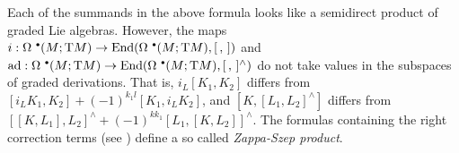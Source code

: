 \begin{rem}
    Each of the summands in the above formula looks like a semidirect product of graded Lie algebras. However, the maps $i:\Omega^{\smbullet}(M;\T M)\to \End(\Omega^{\smbullet}(M;\T M),[\,,\,])$ and $\ad:\Omega^{\smbullet}(M;\T M)\to \End(\Omega^{\smbullet}(M;\T M),[\,,\,]^{\wedge})$ do not take values in the subspaces of graded derivations. That is, $i_L[K_1,K_2]$ differs from $[i_LK_1,K_2]+(-1)^{k_1l}[K_1,i_LK_2]$, and $[K,[L_1,L_2]^{\wedge}]$ differs from $[[K,L_1],L_2]^{\wedge}+(-1)^{kk_1}[L_1,[K,L_2]]^{\wedge}$. The formulas containing the right correction terms (see \cite[Thm.~8.11]{Kolar}) define a so called \emph{Zappa-Szep product}.
\end{rem}




